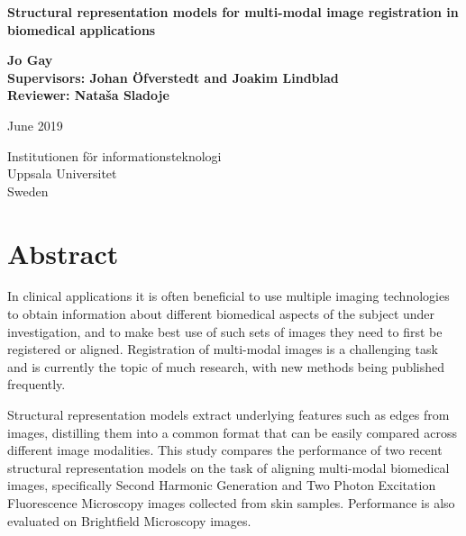 \documentclass{report}
\begin{document}
\begin{titlepage}
   \begin{center}
       \vspace*{1cm}
 
    \Huge
       \textbf{Structural representation models for multi-modal image registration in biomedical applications}

       \vspace{1.5cm}
       
    \Large
       \textbf{Jo Gay\\[1cm]{Supervisors: Johan Öfverstedt and Joakim Lindblad \\Reviewer: Nata\v sa Sladoje}}
       
    \vspace{0.5cm}
    June 2019
  
    \vspace{0.8cm}
 
 
    Institutionen för informationsteknologi\\
    Uppsala Universitet\\
    Sweden\\


   \end{center}
\end{titlepage}

\chapter*{Abstract}
In clinical applications it is often beneficial to use multiple imaging technologies to obtain information about different biomedical aspects of the subject under investigation, and to make best use of such sets of images they need to first be registered or aligned. Registration of multi-modal images is a challenging task and is currently the topic of much research, with new methods being published frequently.

Structural representation models extract underlying features such as edges from images, distilling them into a common format that can be easily compared across different image modalities. This study compares the performance of two recent structural representation models on the task of aligning multi-modal biomedical images, specifically Second Harmonic Generation and Two Photon Excitation Fluorescence Microscopy images collected from skin samples. Performance is also evaluated on Brightfield Microscopy images.
\end{document}
